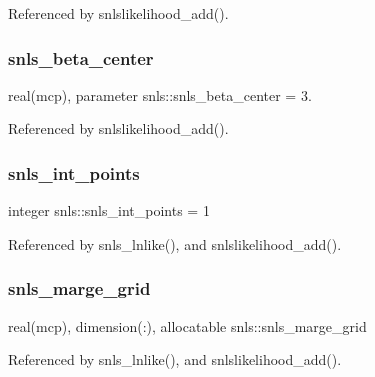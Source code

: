 Referenced by snlslikelihood\+\_\+add().

\mbox{\label{namespacesnls_a82f9e1a099b4e59c715b4fef3c8171cc}} 
\subsubsection{\texorpdfstring{snls\+\_\+beta\+\_\+center}{snls\_beta\_center}}
{\footnotesize\ttfamily real(mcp), parameter snls\+::snls\+\_\+beta\+\_\+center = 3.\hspace{0.3cm}{\ttfamily [private]}}



Referenced by snlslikelihood\+\_\+add().

\mbox{\label{namespacesnls_acf460aba70488a6ee73c575ab0e9d865}} 
\subsubsection{\texorpdfstring{snls\+\_\+int\+\_\+points}{snls\_int\_points}}
{\footnotesize\ttfamily integer snls\+::snls\+\_\+int\+\_\+points = 1\hspace{0.3cm}{\ttfamily [private]}}



Referenced by snls\+\_\+lnlike(), and snlslikelihood\+\_\+add().

\mbox{\label{namespacesnls_a0314289992414e577228e51eb768cb77}} 
\subsubsection{\texorpdfstring{snls\+\_\+marge\+\_\+grid}{snls\_marge\_grid}}
{\footnotesize\ttfamily real(mcp), dimension(\+:), allocatable snls\+::snls\+\_\+marge\+\_\+grid\hspace{0.3cm}{\ttfamily [private]}}



Referenced by snls\+\_\+lnlike(), and snlslikelihood\+\_\+add().

